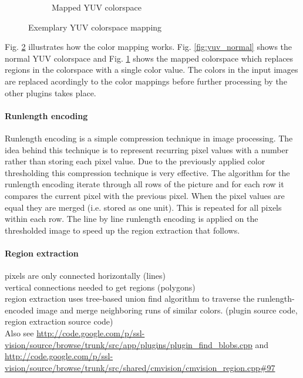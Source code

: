 \begin{savenotes}
\begin{figure}
\begin{subfigure}[b]{0.3\textwidth}
                \caption{Mapped YUV colorspace}
                \label{fig:yuv_mapped}
        \end{subfigure}

        \caption{Exemplary YUV colorspace mapping}\label{fig:yuv}
\end{figure}
\end{savenotes}

Fig. \ref{fig:yuv} illustrates how the color mapping works. Fig.
\ref{fig:yuv_normal} shows the normal YUV colorspace and Fig.
\ref{fig:yuv_mapped} shows the mapped colorspace which replaces regions in the
colorspace with a single color value. The colors in the input images are
replaced acordingly to the color mappings before further processing by the other
plugins takes place.


\paragraph{Runlength encoding}

Runlength encoding is a simple compression technique in image processing. The
idea behind this technique is to represent recurring pixel values with a number
rather than storing each pixel value. Due to the previously applied color thresholding
this compression technique is very effective.
The algorithm for the runlength encoding iterate through all rows of the picture
and for each row it compares the current pixel with the previous pixel. When the pixel values are
equal they are merged (i.e. stored as one unit). This is repeated for all pixels within each row.
The line by line runlength encoding is applied on the thresholded image to speed up the
region extraction that follows.

\paragraph{Region extraction}

pixels are only connected horizontally (lines)\\
vertical connections needed to get regions (polygons)\\
region extraction uses tree-based union find algorithm to traverse the
runlength-encoded image and merge neighboring runs of similar colors. (plugin
source code, region extraction source code)\\



Also see
\url{http://code.google.com/p/ssl-vision/source/browse/trunk/src/app/plugins/plugin_find_blobs.cpp}
and 
\url{http://code.google.com/p/ssl-vision/source/browse/trunk/src/shared/cmvision/cmvision_region.cpp#97}

